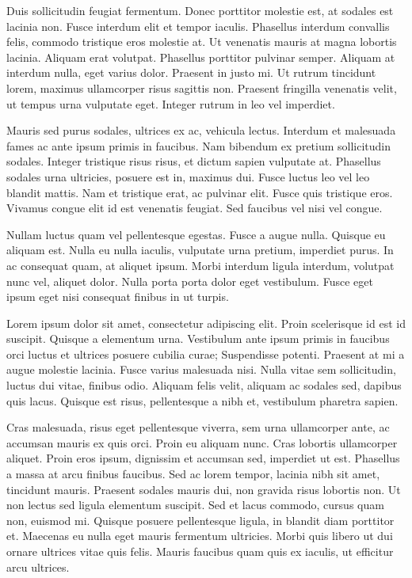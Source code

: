 \documentclass{homework}
\begin{document}
Duis sollicitudin feugiat fermentum. Donec porttitor molestie est, at sodales est lacinia non. Fusce interdum elit et tempor iaculis. Phasellus interdum convallis felis, commodo tristique eros molestie at. Ut venenatis mauris at magna lobortis lacinia. Aliquam erat volutpat. Phasellus porttitor pulvinar semper. Aliquam at interdum nulla, eget varius dolor. Praesent in justo mi. Ut rutrum tincidunt lorem, maximus ullamcorper risus sagittis non. Praesent fringilla venenatis velit, ut tempus urna vulputate eget. Integer rutrum in leo vel imperdiet.

Mauris sed purus sodales, ultrices ex ac, vehicula lectus. Interdum et malesuada fames ac ante ipsum primis in faucibus. Nam bibendum ex pretium sollicitudin sodales. Integer tristique risus risus, et dictum sapien vulputate at. Phasellus sodales urna ultricies, posuere est in, maximus dui. Fusce luctus leo vel leo blandit mattis. Nam et tristique erat, ac pulvinar elit. Fusce quis tristique eros. Vivamus congue elit id est venenatis feugiat. Sed faucibus vel nisi vel congue.

Nullam luctus quam vel pellentesque egestas. Fusce a augue nulla. Quisque eu aliquam est. Nulla eu nulla iaculis, vulputate urna pretium, imperdiet purus. In ac consequat quam, at aliquet ipsum. Morbi interdum ligula interdum, volutpat nunc vel, aliquet dolor. Nulla porta porta dolor eget vestibulum. Fusce eget ipsum eget nisi consequat finibus in ut turpis.

Lorem ipsum dolor sit amet, consectetur adipiscing elit. Proin scelerisque id est id suscipit. Quisque a elementum urna. Vestibulum ante ipsum primis in faucibus orci luctus et ultrices posuere cubilia curae; Suspendisse potenti. Praesent at mi a augue molestie lacinia. Fusce varius malesuada nisi. Nulla vitae sem sollicitudin, luctus dui vitae, finibus odio. Aliquam felis velit, aliquam ac sodales sed, dapibus quis lacus. Quisque est risus, pellentesque a nibh et, vestibulum pharetra sapien.

Cras malesuada, risus eget pellentesque viverra, sem urna ullamcorper ante, ac accumsan mauris ex quis orci. Proin eu aliquam nunc. Cras lobortis ullamcorper aliquet. Proin eros ipsum, dignissim et accumsan sed, imperdiet ut est. Phasellus a massa at arcu finibus faucibus. Sed ac lorem tempor, lacinia nibh sit amet, tincidunt mauris. Praesent sodales mauris dui, non gravida risus lobortis non. Ut non lectus sed ligula elementum suscipit. Sed et lacus commodo, cursus quam non, euismod mi. Quisque posuere pellentesque ligula, in blandit diam porttitor et. Maecenas eu nulla eget mauris fermentum ultricies. Morbi quis libero ut dui ornare ultrices vitae quis felis. Mauris faucibus quam quis ex iaculis, ut efficitur arcu ultrices.
\end{document}
